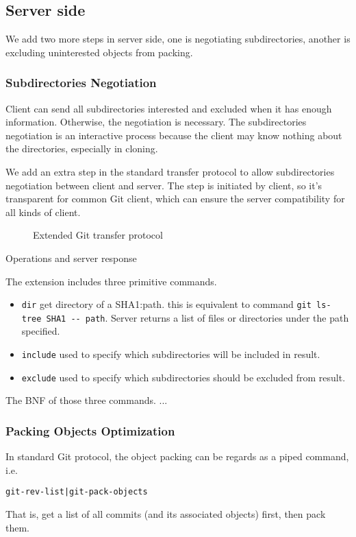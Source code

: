 \documentclass[preprint]{sigplanconf}
\begin{document}
\subsection{Server side}
We add two more steps in server side, one is negotiating subdirectories, another is excluding uninterested objects from packing.
\subsubsection{Subdirectories Negotiation}
Client can send all subdirectories interested and excluded when it has enough information.
Otherwise, the negotiation is necessary.
The subdirectories negotiation is an interactive process because the client may know nothing about the directories, especially in cloning.

We add an extra step in the standard transfer protocol to allow subdirectories negotiation between client and server.
The step is initiated by client, so it's transparent for common Git client, which can ensure the server compatibility for all kinds of client.
\begin{figure}
  \centering
  
  \caption{Extended Git transfer protocol}
  \label{fig:git-proto-ext-seq}
\end{figure}

Operations and server response


The extension includes three primitive commands.
\begin{itemize}
  \item \verb|dir| get directory of a SHA1:path.
    this is equivalent to command \verb|git ls-tree SHA1 -- path|.
    Server returns a list of files or directories under the path specified.
  \item \verb|include| used to specify which subdirectories will be included in result.
  \item \verb|exclude| used to specify which subdirectories should be excluded from result.
\end{itemize}

The BNF of those three commands.
...

\subsubsection{Packing Objects Optimization}
In standard Git protocol, the object packing can be regards as a piped command, i.e.
\begin{verbatim}
git-rev-list|git-pack-objects
\end{verbatim}
That is, get a list of all commits (and its associated objects) first, then pack them.
\end{document}
